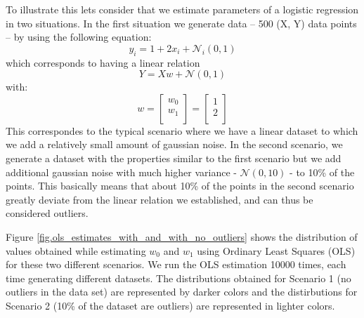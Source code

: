 To illustrate this lets consider that we estimate parameters of a logistic regression in two situations. In the first situation we generate data -- 500 (X, Y) data points -- by using the following equation:
\begin{equation}
y_i = 1 + 2 x_i + \mathcal{N}_i(0,1)
\end{equation}
which corresponds to having a linear relation 
\begin{equation}
Y = Xw + \mathcal{N}(0,1)
\label{eq.linear_relation_for_simulation}
\end{equation}
with:
\begin{equation}
w = 
\begin{bmatrix}
w_0\\
w_1\\
\end{bmatrix}
= 
\begin{bmatrix}
1\\
2\\
\end{bmatrix}
\end{equation}
This correspondes to the typical scenario where we have a linear dataset to which we add a relatively small amount of gaussian noise. In the second scenario, we generate a dataset with the properties similar to the first scenario but we add additional gaussian noise with much higher variance - $\mathcal{N}(0,10)$ - to 10\% of the points. This basically means that about 10\% of the points in the second scenario greatly deviate from the linear relation we established, and can thus be considered outliers.

Figure \ref{fig.ols_estimates_with_and_with_no_outliers} shows the distribution of values obtained while estimating $w_0$ and $w_1$ using Ordinary Least Squares (OLS) for these two different scenarios. We run the OLS estimation 10000 times, each time generating different datasets. The distributions obtained for Scenario 1 (no outliers in the data set) are represented by darker colors and the distirbutions for Scenario 2 (10\% of the dataset are outliers) are represented in lighter colors.

